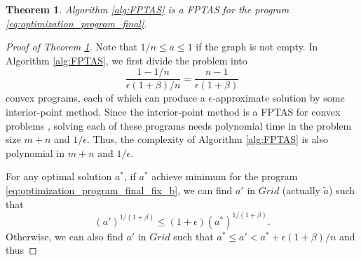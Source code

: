 \documentclass[letterpaper]{article} %
\newtheorem{theorem}{Theorem}
\newcommand{\complexbound}{\beta}
\begin{document}
\begin{theorem}
\label{th:fptas}
  Algorithm \ref{alg:FPTAS} is a FPTAS for the program \eqref{eq:optimization_program_final}.
\end{theorem}

\begin{proof}[Proof of Theorem \ref{th:fptas}]
  
  Note that $1/n\le a\le 1$ if the graph is not empty. %
  In Algorithm \ref{alg:FPTAS}, we first divide the problem into 
  \[\frac{1-1/n}{\epsilon(1+\beta)/n}=\frac{n-1}{\epsilon(1+\complexbound{})}\]
  convex programs, each of which can produce a $\epsilon$-approximate solution by some interior-point method. 
  Since the interior-point method is a FPTAS for convex problems \cite{boyd2004convex}, solving each of these programs needs polynomial time in the problem size $m+n$ and $1/\epsilon$.
  Thus, the complexity of Algorithm \ref{alg:FPTAS} is also polynomial in $m+n$ and $1/\epsilon$.

  For any optimal solution $a^*$, if $a^*$ achieve minimum for the program \eqref{eq:optimization_program_final_fix_b}, we can find $a'$ in $Grid$ (actually $\tilde{a}$) such that 
  \begin{equation}
    \label{eq:a_mini_bound}
    (a')^{1/(1+\complexbound{})}\le (1+\epsilon)(a^*)^{1/(1+\complexbound{})}.
  \end{equation}
  Otherwise, we can also find $a'$ in $Grid$ such that $a^*\le a'<a^*+\epsilon(1+\beta)/n$ and thus


\end{proof}
\end{document}
